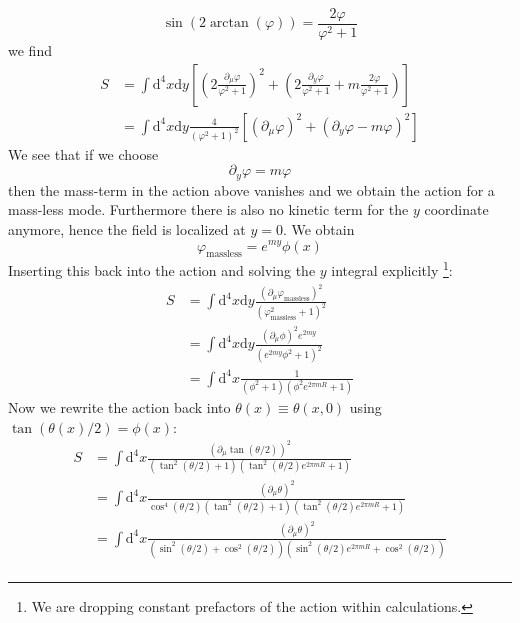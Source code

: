 \documentclass[master,       %
               twoside,        %
               BCOR10mm,       %
               english,ngerman, %
               ]{GAUBM}
\begin{document}
\begin{otherlanguage}{english}
\begin{equation}
	\sin(2 \arctan(\varphi)) = \frac{2 \varphi}{\varphi^2 + 1}
\end{equation}
we find
\begin{align}
    S &= \int \mathrm{d}^4 x \mathrm{d} y \left[
    \left(2 \frac{\partial_\mu \varphi}{\varphi^2 + 1} \right)^2 +
    \left(2 \frac{\partial_y \varphi}{\varphi^2 + 1} + m \frac{2 \varphi}{\varphi^2 + 1} \right) \right] \nonumber \\
    &= \int \mathrm{d}^4 x \mathrm{d} y  \frac{4}{(\varphi^2 + 1)^2}
    \left[ (\partial_\mu \varphi)^2 + (\partial_y \varphi - m \varphi)^2 \right]
\end{align}
We see that if we choose
\begin{equation}
	\partial_y \varphi = m \varphi
\end{equation}
then the mass-term in the action above vanishes and we obtain the action for a mass-less mode. Furthermore there is also no kinetic term for the $y$ coordinate anymore, hence the field is localized at $y = 0$.
We obtain
\begin{equation}
	\varphi_{\mathrm{massless}} = e^{my} \phi(x)
\end{equation}
Inserting this back into the action and solving the $y$ integral explicitly \footnote{We are dropping constant prefactors of the action within calculations.}:
\begin{align}
	S &= \int \mathrm{d}^4 x \mathrm{d} y  \frac{(\partial_\mu \varphi_{\mathrm{massless}})^2}{(\varphi_{\mathrm{massless}}^2 + 1)^2} \nonumber \\
	&= \int \mathrm{d}^4 x \mathrm{d} y  \frac{(\partial_\mu \phi)^2 e^{2my}}{(e^{2my} \phi^2 + 1)^2} \nonumber \\
	&= \int \mathrm{d}^4 x\frac{1}{(\phi^2 + 1)(\phi^2 e^{2\pi m R} + 1)}
\end{align}
Now we rewrite the action back into $\theta(x) \equiv \theta(x, 0)$ using $\tan(\theta(x)/2) = \phi(x)$:
\begin{align}
	 S &= \int \mathrm{d}^4 x \frac{(\partial_\mu \tan(\theta / 2))^2}{(\tan^2(\theta / 2) + 1)(\tan^2(\theta / 2) e^{2\pi m R} + 1)} \nonumber \\
	 &= \int \mathrm{d}^4 x \frac{(\partial_\mu \theta)^2}{\cos^4(\theta/2)(\tan^2(\theta / 2) + 1)(\tan^2(\theta / 2) e^{2\pi m R} + 1)} \nonumber \\
	 &= \int \mathrm{d}^4 x \frac{(\partial_\mu \theta)^2}{(\sin^2(\theta / 2) + \cos^2(\theta/2))(\sin^2(\theta / 2) e^{2\pi m R} + \cos^2(\theta / 2))} \nonumber \\

\end{align}
\end{otherlanguage}
\end{document}
